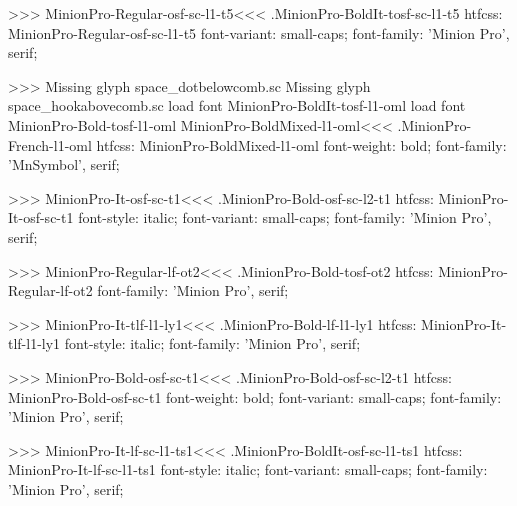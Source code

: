 {>>>
\<MinionPro-Regular-osf-sc-l1-t5\><<<
.MinionPro-BoldIt-tosf-sc-l1-t5
htfcss:  MinionPro-Regular-osf-sc-l1-t5  font-variant: small-caps; font-family: 'Minion Pro', serif;

>>>
Missing glyph	space_dotbelowcomb.sc
Missing glyph	space_hookabovecomb.sc
load font	MinionPro-BoldIt-tosf-l1-oml
load font	MinionPro-Bold-tosf-l1-oml
\<MinionPro-BoldMixed-l1-oml\><<<
.MinionPro-French-l1-oml
htfcss:  MinionPro-BoldMixed-l1-oml  font-weight: bold; font-family: 'MnSymbol', serif;

>>>
\<MinionPro-It-osf-sc-t1\><<<
.MinionPro-Bold-osf-sc-l2-t1
htfcss:  MinionPro-It-osf-sc-t1  font-style: italic; font-variant: small-caps; font-family: 'Minion Pro', serif;

>>>
\<MinionPro-Regular-lf-ot2\><<<
.MinionPro-Bold-tosf-ot2
htfcss:  MinionPro-Regular-lf-ot2  font-family: 'Minion Pro', serif;

>>>
\<MinionPro-It-tlf-l1-ly1\><<<
.MinionPro-Bold-lf-l1-ly1
htfcss:  MinionPro-It-tlf-l1-ly1  font-style: italic; font-family: 'Minion Pro', serif;

>>>
\<MinionPro-Bold-osf-sc-t1\><<<
.MinionPro-Bold-osf-sc-l2-t1
htfcss:  MinionPro-Bold-osf-sc-t1  font-weight: bold; font-variant: small-caps; font-family: 'Minion Pro', serif;

>>>
\<MinionPro-It-lf-sc-l1-ts1\><<<
.MinionPro-BoldIt-osf-sc-l1-ts1
htfcss:  MinionPro-It-lf-sc-l1-ts1  font-style: italic; font-variant: small-caps; font-family: 'Minion Pro', serif;

}
